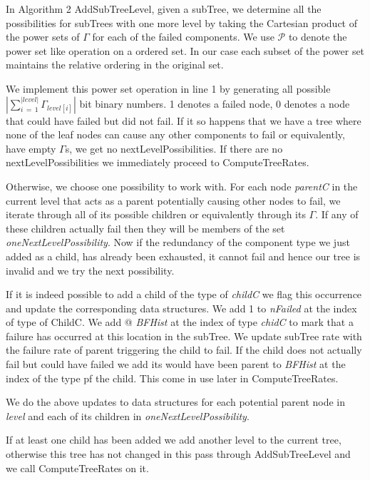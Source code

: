 \documentclass[12pt]{article}
\newcommand{\Varname}[1]{\textrm{\it#1}}
\begin{document}
In Algorithm 2 AddSubTreeLevel, given a subTree, we determine all the possibilities for subTrees with one more level by taking the Cartesian product of the power sets of $\Gamma$ for each of the failed components. We use $\mathcal{P}$ to denote the power set like operation on a ordered set. In our case each subset of the power set maintains the relative ordering in the original set.

We implement this power set operation in line 1 by generating all possible $|\sum\limits_{i\,=\,1}^{|level|}\Gamma_{level[i]}|$ bit binary numbers. 1 denotes a failed node, 0 denotes a node that could have failed but did not fail. If it so happens that we have a tree where none of the leaf nodes can cause any other components to fail or equivalently, have empty $\Gamma$s, we get no nextLevelPossibilities. If there are no nextLevelPossibilities we immediately proceed to ComputeTreeRates.   

Otherwise, we choose one possibility to work with. For each node \Varname{parentC} in the current level that acts as a parent potentially causing other nodes to fail, we iterate through all of its possible children or equivalently through its $\Gamma$. If any of these children actually fail then they will be members of the set \Varname{oneNextLevelPossibility}. Now if the redundancy of the component type we just added as a child, has already been exhausted, it cannot fail and hence our tree is invalid and we try the next possibility.

If it is indeed possible to add a child of the type of \Varname{childC} we flag this occurrence and update the corresponding data structures. We add 1 to \Varname{nFailed} at the index of type of ChildC. We add @ \Varname{BFHist} at the index of type \Varname{chidC} to mark that a failure has occurred at this location in the subTree. We update subTree rate with the failure rate of parent triggering the child to fail. If the child does not actually fail but could have failed we add its would have been parent to \Varname{BFHist} at the index of the type pf the child. This come in use later in ComputeTreeRates.   

We do the above updates to data structures for each potential parent node in \Varname{level} and each of its children in \Varname{oneNextLevelPossibility}. 

If at least one child has been added we add another level to the current tree, otherwise this tree has not changed in this pass through AddSubTreeLevel and we call ComputeTreeRates on it. 
\end{document}
